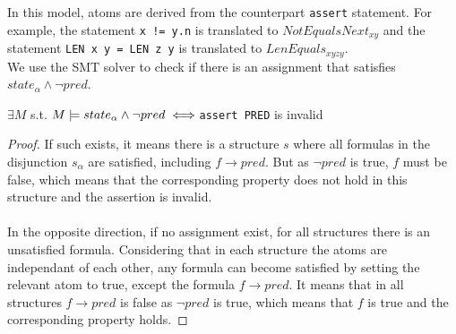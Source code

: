 In this model, atoms are derived from the counterpart \texttt{assert} statement. For example, the statement \texttt{x != y.n} is translated to $NotEqualsNext_{xy}$ and the statement \texttt{LEN x y = LEN z y} is translated to $LenEquals_{xyzy}$.\\

We use the SMT solver to check if there is an assignment that satisfies $state_\alpha\land\neg pred$. 
\begin{theorem}
	$\exists M$ s.t. $M\models state_\alpha\land\neg pred \iff \normalfont$\texttt{assert PRED} is invalid 
\end{theorem}
\begin{proof}	
If such exists, it means there is a structure $s$ where all formulas in the disjunction $s_\alpha$ are satisfied, including $f\to pred$. But as $\neg pred$ is true, $f$ must be false, which means that the corresponding property does not hold in this structure and the assertion is invalid.\\ \\
In the opposite direction, if no assignment exist, for all structures there is an unsatisfied formula. Considering that in each structure the atoms are independant of each other, any formula can become satisfied by setting the relevant atom to true, except the formula $f\to pred$. It means that in all structures $f\to pred$ is false as $\neg pred$ is true, which means that $f$ is true and the corresponding property holds.
\end{proof}
